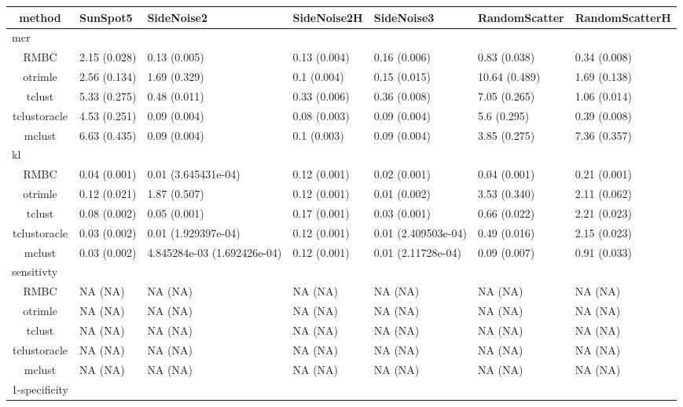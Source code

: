 \captionsetup[table]{labelformat=empty,skip=1pt}
\begin{longtable}{cllllll}
\toprule
method & SunSpot5 & SideNoise2 & SideNoise2H & SideNoise3 & RandomScatter & RandomScatterH \\ 
\midrule
\multicolumn{1}{l}{mcr} \\ 
\midrule
RMBC & 2.15 (0.028) & 0.13 (0.005) & 0.13 (0.004) & 0.16 (0.006) & 0.83 (0.038) & 0.34 (0.008) \\ 
otrimle & 2.56 (0.134) & 1.69 (0.329) & 0.1 (0.004) & 0.15 (0.015) & 10.64 (0.489) & 1.69 (0.138) \\ 
tclust & 5.33 (0.275) & 0.48 (0.011) & 0.33 (0.006) & 0.36 (0.008) & 7.05 (0.265) & 1.06 (0.014) \\ 
tclustoracle & 4.53 (0.251) & 0.09 (0.004) & 0.08 (0.003) & 0.09 (0.004) & 5.6 (0.295) & 0.39 (0.008) \\ 
mclust & 6.63 (0.435) & 0.09 (0.004) & 0.1 (0.003) & 0.09 (0.004) & 3.85 (0.275) & 7.36 (0.357) \\ 
\midrule
\multicolumn{1}{l}{kl} \\ 
\midrule
RMBC & 0.04 (0.001) & 0.01 (3.645431e-04) & 0.12 (0.001) & 0.02 (0.001) & 0.04 (0.001) & 0.21 (0.001) \\ 
otrimle & 0.12 (0.021) & 1.87 (0.507) & 0.12 (0.001) & 0.01 (0.002) & 3.53 (0.340) & 2.11 (0.062) \\ 
tclust & 0.08 (0.002) & 0.05 (0.001) & 0.17 (0.001) & 0.03 (0.001) & 0.66 (0.022) & 2.21 (0.023) \\ 
tclustoracle & 0.03 (0.002) & 0.01 (1.929397e-04) & 0.12 (0.001) & 0.01 (2.409503e-04) & 0.49 (0.016) & 2.15 (0.023) \\ 
mclust & 0.03 (0.002) & 4.845284e-03 (1.692426e-04) & 0.12 (0.001) & 0.01 (2.11728e-04) & 0.09 (0.007) & 0.91 (0.033) \\ 
\midrule
\multicolumn{1}{l}{sensitivty} \\ 
\midrule
RMBC & NA (NA) & NA (NA) & NA (NA) & NA (NA) & NA (NA) & NA (NA) \\ 
otrimle & NA (NA) & NA (NA) & NA (NA) & NA (NA) & NA (NA) & NA (NA) \\ 
tclust & NA (NA) & NA (NA) & NA (NA) & NA (NA) & NA (NA) & NA (NA) \\ 
tclustoracle & NA (NA) & NA (NA) & NA (NA) & NA (NA) & NA (NA) & NA (NA) \\ 
mclust & NA (NA) & NA (NA) & NA (NA) & NA (NA) & NA (NA) & NA (NA) \\ 
\midrule
\multicolumn{1}{l}{1-specificity} \\ 

\end{longtable}
